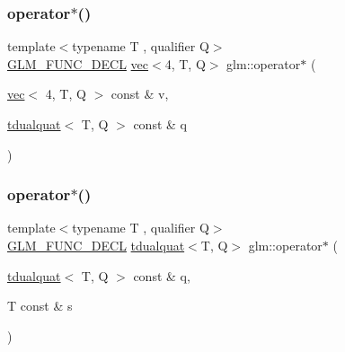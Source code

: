 \mbox{\label{group__gtx__dual__quaternion_ga9fd4e646fe49daed7aabbf0cb8736685}} 
\subsubsection{\texorpdfstring{operator$\ast$()}{operator*()}\hspace{0.1cm}{\footnotesize\ttfamily [5/7]}}
{\footnotesize\ttfamily template$<$typename T , qualifier Q$>$ \\
\mbox{\hyperlink{setup_8hpp_ab2d052de21a70539923e9bcbf6e83a51}{G\+L\+M\+\_\+\+F\+U\+N\+C\+\_\+\+D\+E\+CL}} \mbox{\hyperlink{structglm_1_1vec}{vec}}$<$4, T, Q$>$ glm\+::operator$\ast$ (\begin{DoxyParamCaption}\item[{\mbox{\hyperlink{structglm_1_1vec}{vec}}$<$ 4, T, Q $>$ const \&}]{v,  }\item[{\mbox{\hyperlink{structglm_1_1tdualquat}{tdualquat}}$<$ T, Q $>$ const \&}]{q }\end{DoxyParamCaption})}

\mbox{\label{group__gtx__dual__quaternion_ga03c35eae969f074f10fa2bf473670ad7}} 
\subsubsection{\texorpdfstring{operator$\ast$()}{operator*()}\hspace{0.1cm}{\footnotesize\ttfamily [6/7]}}
{\footnotesize\ttfamily template$<$typename T , qualifier Q$>$ \\
\mbox{\hyperlink{setup_8hpp_ab2d052de21a70539923e9bcbf6e83a51}{G\+L\+M\+\_\+\+F\+U\+N\+C\+\_\+\+D\+E\+CL}} \mbox{\hyperlink{structglm_1_1tdualquat}{tdualquat}}$<$T, Q$>$ glm\+::operator$\ast$ (\begin{DoxyParamCaption}\item[{\mbox{\hyperlink{structglm_1_1tdualquat}{tdualquat}}$<$ T, Q $>$ const \&}]{q,  }\item[{T const \&}]{s }\end{DoxyParamCaption})}

